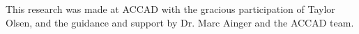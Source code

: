 \documentclass{nime-alternate}
\begin{document}
This research was made at ACCAD with the gracious participation of Taylor Olsen, and the guidance and support by Dr. Marc Ainger and the ACCAD team.





 
\end{document}
